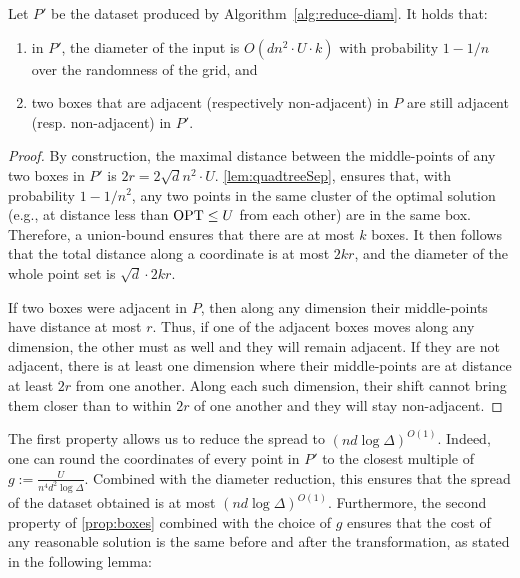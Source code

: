 \begin{proposition}\label{prop:boxes}
    Let $P'$ be the dataset produced by Algorithm~\ref{alg:reduce-diam}. It holds that:
    \begin{enumerate}
        \item in $P'$, the diameter of the input is $O(d n^2\cdot U \cdot k)$ with probability $1-1/n$ over the randomness of the grid, and
        \item two boxes that are adjacent (respectively non-adjacent) in $P$ are still adjacent (resp. non-adjacent) in $P'$.
    \end{enumerate}
\end{proposition}
\begin{proof}

By construction, the maximal distance between the middle-points of any two boxes in $P'$ is $2r = 2\sqrt d n^2\cdot U$. \cref{lem:quadtreeSep}, ensures that, with
probability $1-1/n^2$, any two points in the same cluster of the optimal solution (e.g., at distance less than $\text{OPT} \leq U$ from each other) are in the same
box. Therefore, a union-bound ensures that there are at most $k$ boxes.  It then follows that the total distance along a coordinate is at most $2kr$, and the
diameter of the whole point set is $\sqrt{d} \cdot 2kr$.

If two boxes were adjacent in $P$, then along any dimension their middle-points have distance at most $r$. Thus, if one of the adjacent boxes moves along any
dimension, the other must as well and they will remain adjacent.  If they are not adjacent, there is at least one dimension where their middle-points are at
distance at least $2r$ from one another. Along each such dimension, their shift cannot bring them closer than to within $2r$ of one another and they will stay
non-adjacent.

\end{proof}

The first property allows us to reduce the spread to $(nd \log \Delta)^{O(1)}$.  Indeed, one can round the coordinates of every point in $P'$ to the closest
multiple of $g := \frac{U}{n^4 d^{2} \log \Delta}$.  Combined with the diameter reduction, this ensures that the spread of the dataset obtained is at most $(nd
\log \Delta)^{O(1)}$.  Furthermore, the second property of \cref{prop:boxes} combined with the choice of $g$ ensures that the cost of any reasonable solution is
the same before and after the transformation, as stated in the following lemma:

